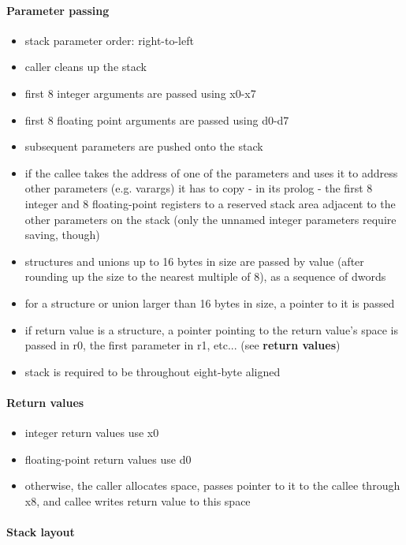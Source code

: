 \paragraph{Parameter passing}

\begin{itemize}
\item stack parameter order: right-to-left
\item caller cleans up the stack
\item first 8 integer arguments are passed using x0-x7
\item first 8 floating point arguments are passed using d0-d7
\item subsequent parameters are pushed onto the stack
\item if the callee takes the address of one of the parameters and uses it to address other parameters (e.g. varargs) it has to copy - in its prolog - the first 8 integer and 8 floating-point registers to a reserved stack area adjacent to the other parameters on the stack (only the unnamed integer parameters require saving, though)
\item structures and unions up to 16 bytes in size are passed by value (after rounding up the size to the nearest multiple of 8), as a sequence of dwords
\item for a structure or union larger than 16 bytes in size, a pointer to it is passed
\item if return value is a structure, a pointer pointing to the return value's space is passed in r0, the first parameter in r1, etc... (see {\bf return values})
\item stack is required to be throughout eight-byte aligned
\end{itemize}

\paragraph{Return values}
\begin{itemize}
\item integer return values use x0
\item floating-point return values use d0
\item otherwise, the caller allocates space, passes pointer to it to the callee through x8, and callee writes return value to this space
\end{itemize}

\paragraph{Stack layout}

